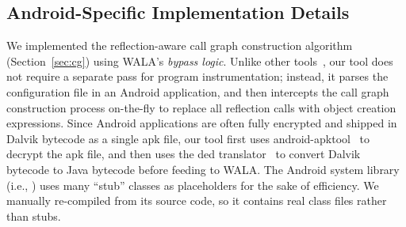 \subsection{Android-Specific Implementation Details}


We implemented the reflection-aware call graph construction
 algorithm (Section~\ref{sec:cg}) using WALA's \textit{bypass logic}.
Unlike other tools~\cite{Payet:2011:SAA:2032266.2032299}, our tool
does not require a separate pass for program instrumentation; instead, it
parses the configuration file in an Android application,
and then intercepts the call graph construction
process on-the-fly to replace all reflection calls with object creation expressions.
Since Android applications are often fully encrypted and shipped in Dalvik
bytecode as a single apk file, our tool first uses
android-apktool~\cite{apktool} to
decrypt the apk file, and then uses the 
ded translator~\cite{ded} to convert
Dalvik bytecode to Java bytecode before feeding to WALA\@.  The Android system
library (i.e., ) uses many ``stub'' classes as
placeholders for the sake of efficiency. We manually re-compiled 
 from its source code, so it contains real
class files rather than stubs.



